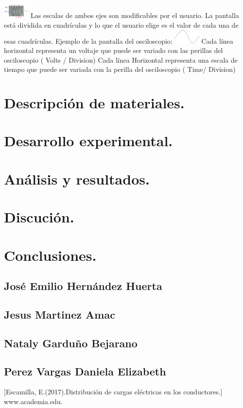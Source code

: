 \documentclass[10pt]{article}
\begin{document}
\begin{multicols}{2}
\includegraphics[width=0.1\textwidth]{Imagenes/Marco Teorico/Imagen5 pero usa el tuyo .png}
Las escalas de ambos ejes son modificables por el usuario. La pantalla está dividida en cuadrículas y lo que el usuario elige es el valor de cada una de esas cuadrículas.
Ejemplo de la pantalla del osciloscopio:
\includegraphics[width=0.1\textwidth]{Imagenes/Marco Teorico/Imagen6}
Cada línea horizontal representa un voltaje que puede ser variado con las perillas del osciloscopio ( Volts / Division)
Cada línea Horizontal representa una escala de tiempo que puede ser variada con la perilla del osciloscopio ( Time/ Division)




\section{Descripción de materiales.}

 

\section{Desarrollo experimental.}





\section{Análisis y resultados.}




\section{Discución.}

\section{Conclusiones.}
\subsection{José Emilio Hernández Huerta}

\subsection{Jesus Martinez Amac}

\subsection{Nataly Garduño Bejarano}


\subsection{Perez Vargas Daniela Elizabeth}


\end{multicols}
\newpage
\clearpage
\begin{thebibliography}{0}
	\bibitem{}[Escamilla, E.(2017).Distribución de cargas eléctricas en los conductores.]
	www.academia.edu.
\end{thebibliography}
\end{document}
